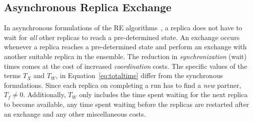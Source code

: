\documentclass{rspublic}
\newcommand{\jhanote}[1]{ {\textcolor{red} { ***shantenu: #1 }}}
\newcommand{\alnote}[1]{ {\textcolor{blue} { ***andre: #1 }}}
\newcommand{\athotanote}[1]{ {\textcolor{green} { ***athota: #1 }}}
\newcommand{\alnote}[1]{}
\newcommand{\athotanote}[1]{}
\newcommand{\jhanote}[1]{}
\begin{document}
\subsection{Asynchronous Replica Exchange}


In asynchronous formulations of the RE
algorithms~\citep{parashar_arepex,DBLP:journals/jcc/GallicchioLP08}, a
replica does not have to wait for {\it all} other replicas to reach a
pre-determined state. An exchange occurs whenever a replica reaches a
pre-determined state and perform an exchange with another suitable
replica in the ensemble.  The reduction in {\it synchronization}
(wait) times comes at the cost of increased {\it coordination} costs.
The specific values of the terms $T_{X}$ and $T_W$, in
Equation~\ref{eq:totaltime} differ from the synchronous formulations.
Since each replica on completing a run has to find a {\it new}
partner, $T_f \neq 0$.  Additionally, $T_W$ only includes the time
spent waiting for the next replica to become available, any time spent
waiting before the replicas are restarted after an exchange and any
other miscellaneous costs.



\end{document}
